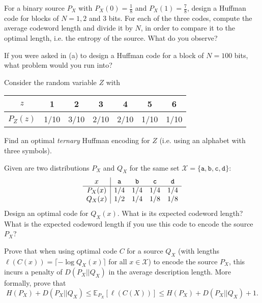 \documentclass[a4paper,10pt,landscape,twocolumn]{scrartcl}
\begin{document}
\begin{exercise}
	\begin{subex}[(4pt)]
	For a binary source $P_X$ with $P_X(0) = \frac{1}{8}$ and $P_X(1) = \frac{7}{8}$, design a Huffman code for blocks of $N = 1,2$ and 3 bits. For each of the three codes, compute the average codeword length and divide it by $N$, in order to compare it to the optimal length, i.e. the entropy of the source. What do you observe?
	\end{subex}
	\begin{subex}[(1pt)]
	If you were asked in (a) to design a Huffman code for a block of $N = 100$ bits, what problem would you run into?
	\end{subex}
	\begin{subex}[(2pt)]
	Consider the random variable $Z$ with
	\begin{center}
	\begin{tabular}{c | c c c c c c}
	$z$ & 1 & 2 & 3 & 4 & 5 & 6\\
	\hline
	$P_Z(z)$ & 1/10 & 3/10 & 2/10 & 2/10 & 1/10 & 1/10\\
	\end{tabular}
	\end{center}
	Find an optimal \emph{ternary} Huffman encoding for $Z$ (i.e. using an alphabet with three symbols).
	\end{subex}
\end{exercise}



\begin{exercise}
\begin{subex}[(2pt)]
Given are two distributions $P_X$ and $Q_X$ for the same set $\mathcal{X} = \{\mathtt{a,b,c,d}\}$:
\[
\begin{array}{c | c c c c}
x & \mathtt{a}&\mathtt{b}&\mathtt{c}&\mathtt{d}\\\hline
P_X(x) & 1/4&1/4&1/4&1/4\\
Q_X(x) & 1/2&1/4&1/8&1/8\\
\end{array}
\]
Design an optimal code for $Q_X(x)$. What is its expected codeword length? What is the expected codeword length if you use this code to encode the source $P_X$?
\end{subex}
\begin{subex}[(4pt)]
Prove that when using optimal code $C$ for a source $Q_X$ (with lengths $\ell(C(x)) = \lceil -\log Q_X(x) \rceil$ for all $x \in \mathcal{X}$) to encode the source $P_X$, this incurs a penalty of $D(P_X||Q_X)$ in the average description length. More formally, prove that
\[
H(P_X) + D(P_X||Q_X) \leq \mathbb{E}_{P_X}[\ell(C(X))] \leq H(P_X) + D(P_X||Q_X) + 1.
\]
\end{subex}
\end{exercise}
\end{document}
